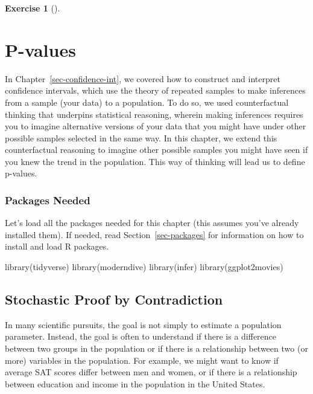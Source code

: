 \documentclass[
  letterpaper,
  DIV=11,
  numbers=noendperiod]{scrreprt}
\newenvironment{Shaded}{\begin{snugshade}}{\end{snugshade}}
\newcommand{\FunctionTok}[1]{\textcolor[rgb]{0.28,0.35,0.67}{#1}}
\newcommand{\NormalTok}[1]{\textcolor[rgb]{0.00,0.23,0.31}{#1}}
\theoremstyle{definition}
\newtheorem{exercise}{Exercise}[chapter]
\theoremstyle{remark}
\begin{document}
\leavevmode{}%
\begin{exercise}[]\label{exr-ch10-adv1}

\end{exercise}

\hypertarget{sec-pvalues}{%
\chapter{P-values}\label{sec-pvalues}}

In Chapter~\ref{sec-confidence-int}, we covered how to construct and
interpret confidence intervals, which use the theory of repeated samples
to make inferences from a sample (your data) to a population. To do so,
we used counterfactual thinking that underpins statistical reasoning,
wherein making inferences requires you to imagine alternative versions
of your data that you might have under other possible samples selected
in the same way. In this chapter, we extend this counterfactual
reasoning to imagine other possible samples you might have seen if you
knew the trend in the population. This way of thinking will lead us to
define p-values.

\hypertarget{packages-needed-4}{%
\subsection*{Packages Needed}\label{packages-needed-4}}

Let's load all the packages needed for this chapter (this assumes you've
already installed them). If needed, read Section~\ref{sec-packages} for
information on how to install and load R packages.

\begin{Shaded}
\begin{Highlighting}[]
\FunctionTok{library}\NormalTok{(tidyverse)}
\FunctionTok{library}\NormalTok{(moderndive)}
\FunctionTok{library}\NormalTok{(infer)}
\FunctionTok{library}\NormalTok{(ggplot2movies)}
\end{Highlighting}
\end{Shaded}

\hypertarget{sec-proof-by-contradiction}{%
\section{Stochastic Proof by
Contradiction}\label{sec-proof-by-contradiction}}

In many scientific pursuits, the goal is not simply to estimate a
population parameter. Instead, the goal is often to understand if there
is a difference between two groups in the population or if there is a
relationship between two (or more) variables in the population. For
example, we might want to know if average SAT scores differ between men
and women, or if there is a relationship between education and income in
the population in the United States.
\end{document}
